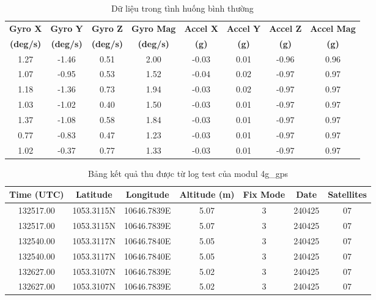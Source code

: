 \documentclass[a4paper,12pt]{report}
\begin{document}
	\begin{table}[h]
		\centering
		\caption{Dữ liệu trong tình huống bình thường}
		\label{tab:normal_data}
		\begin{tabular}{|c|c|c|c|c|c|c|c|}
			\hline
			\textbf{Gyro X} & \textbf{Gyro Y} & \textbf{Gyro Z} & \textbf{Gyro Mag} & \textbf{Accel X} & \textbf{Accel Y} & \textbf{Accel Z} & \textbf{Accel Mag} \\
			\textbf{(deg/s)} & \textbf{(deg/s)} & \textbf{(deg/s)} & \textbf{(deg/s)} & \textbf{(g)} & \textbf{(g)} & \textbf{(g)} & \textbf{(g)} \\
			\hline
			1.27 & -1.46 & 0.51 & 2.00 & -0.03 & 0.01 & -0.96 & 0.96 \\
			1.07 & -0.95 & 0.53 & 1.52 & -0.04 & 0.02 & -0.97 & 0.97 \\
			1.18 & -1.36 & 0.73 & 1.94 & -0.03 & 0.02 & -0.97 & 0.97 \\
			1.03 & -1.02 & 0.40 & 1.50 & -0.03 & 0.01 & -0.97 & 0.97 \\
			1.37 & -1.08 & 0.58 & 1.84 & -0.03 & 0.01 & -0.97 & 0.97 \\
			0.77 & -0.83 & 0.47 & 1.23 & -0.03 & 0.01 & -0.97 & 0.97 \\
			1.02 & -0.37 & 0.77 & 1.33 & -0.03 & 0.01 & -0.97 & 0.97 \\
			\hline
		\end{tabular}
	\end{table}
	
	\begin{table}[h]
		\centering
		\caption{Bảng kết quả thu được từ log test của modul 4g\_gps}
		\label{tab:gps_data}
		\begin{tabular}{|c|c|c|c|c|c|c|}
			\hline
			\textbf{Time (UTC)} & \textbf{Latitude} & \textbf{Longitude} & \textbf{Altitude (m)} & \textbf{Fix Mode} & \textbf{Date} & \textbf{Satellites} \\
			\hline
			132517.00 & 1053.3115N & 10646.7839E & 5.07 & 3 & 240425 & 07 \\
			132517.00 & 1053.3115N & 10646.7839E & 5.07 & 3 & 240425 & 07 \\
			132540.00 & 1053.3117N & 10646.7840E & 5.05 & 3 & 240425 & 07 \\
			132540.00 & 1053.3117N & 10646.7840E & 5.05 & 3 & 240425 & 07 \\
			132627.00 & 1053.3107N & 10646.7839E & 5.02 & 3 & 240425 & 07 \\
			132627.00 & 1053.3107N & 10646.7839E & 5.02 & 3 & 240425 & 07 \\
			\hline
		\end{tabular}
	\end{table}
	
\end{document}
